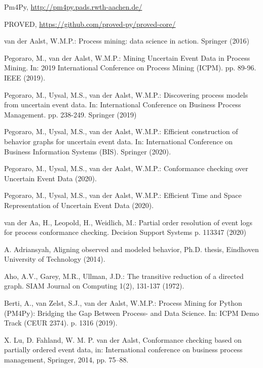 \begin{thebibliography}

Pm4Py, \url{http://pm4py.pads.rwth-aachen.de/}

PROVED, \url{https://github.com/proved-py/proved-core/}

van der Aalst, W.M.P.: Process mining: data science in action. Springer (2016)

Pegoraro, M., van der Aalst, W.M.P.: Mining Uncertain Event Data in Process Mining. In: 2019 International Conference on Process Mining (ICPM). pp. 89-96. IEEE (2019).

Pegoraro, M., Uysal, M.S., van der Aalst, W.M.P.: Discovering process models from uncertain event data. In: International Conference on Business Process Management. pp. 238-249. Springer (2019)

Pegoraro, M., Uysal, M.S., van der Aalst, W.M.P.: Efficient construction of behavior graphs for uncertain event data. In: International Conference on Business Information Systems (BIS). Springer (2020).

Pegoraro, M., Uysal, M.S., van der Aalst, W.M.P.: Conformance checking over Uncertain Event Data (2020).

Pegoraro, M., Uysal, M.S., van der Aalst, W.M.P.: Efficient Time and Space Representation of Uncertain Event Data (2020). 

van der Aa, H., Leopold, H., Weidlich, M.: Partial order resolution of event logs for process conformance checking. Decision Support Systems p. 113347 (2020)

A. Adriansyah, Aligning observed and modeled behavior, Ph.D. thesis, Eindhoven University of Technology (2014).

Aho, A.V., Garey, M.R., Ullman, J.D.: The transitive reduction of a directed graph.
SIAM Journal on Computing 1(2), 131-137 (1972).

Berti, A., van Zelst, S.J., van der Aalst, W.M.P.: Process Mining for Python (PM4Py): Bridging the Gap Between Process- and Data Science. In: ICPM Demo Track (CEUR 2374). p. 1316 (2019).

X. Lu, D. Fahland, W. M. P. van der Aalst, Conformance checking based on partially ordered event data, in: International conference on business process management, Springer, 2014, pp. 75–88.


\end{thebibliography}
